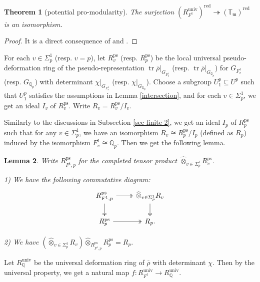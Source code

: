 \documentclass[a4paper, 12pt]{amsart}
\newtheorem{thm}{Theorem}[subsection]
\newtheorem{lem}[thm]{Lemma}
\def\ps{\mathrm{ps}}
\newcommand{\Q}{\mathbb{Q}}
\newcommand{\T}{\mathbb{T}}
\newcommand{\km}{\mathfrak{m}}
\begin{document}
    \begin{thm}[potential pro-modularity]\label{potential pro-modularity irr}
    	The surjection $ (R_{F^1}^{\operatorname{univ}})^{\operatorname{red}} \twoheadrightarrow (\T_\km)^{\operatorname{red}}$ is an isomorphism.
    \end{thm}
    
    \begin{proof}
    	It is a direct consequence of \cite[Proposition 4.3.3]{Zhang:2024aa} and \cite[Proposition 3.1.5]{Zhang:2024ab}.
    \end{proof}
    
    For each $v \in \Sigma_p^1$ (resp. $v=p$), let $R_v^\ps$ (resp. $R_p^\ps$) be the local universal pseudo-deformation ring of the pseudo-representation $\operatorname{tr} \bar{\rho}|_{G_{F^1_v}}$ (resp. $\operatorname{tr} \bar{\rho}|_{G_{\Q_p}}$)  for $ {G_{F^1_v}}$ (resp. $ {G_{\Q_p}}$) with determinant $\chi|_{G_{F^1_v}}$ (resp. $\chi|_{G_{\Q_p}}$). Choose a subgroup $U^p_1 \subseteq U^p$ such that  $U^p_1$ satisfies the assumptions in Lemma \ref{intersection}, and for each $v \in \Sigma_p^1$, we get an ideal $I_v$ of $R_v^\ps$. Write $R_v = R_v^\ps/I_v $.  
    
    Similarly to the discussions in Subsection \ref{sec finite 2}, we get an ideal $I_p$ of $R_p^\ps$ such that for any $v \in \Sigma_p^1$, we have an isomorphism $R_v \cong R_p^\ps/I_p$ (defined as $R_p$) induced by the isomorphism $F^1_v \cong \Q_p$. Then we get the following lemma.
    
    \begin{lem}\label{com dia irr2} Write $R_{F^1, p}^\ps$ for the completed tensor product $ \widehat{\otimes}_{v \in \Sigma^1_p} R_{v}^\ps$.
    	
    	1) We have the following commutative diagram:
    	\[\begin{tikzcd}
    		R_{F^1, p}^\ps  \arrow[r, two heads] \arrow[d, two heads]& \widehat{\otimes}_{v \in \Sigma^1_p} R_{v} \arrow[d, two heads]\\
    		 R_{p}^\ps \arrow[r, two heads] &  R_{p}.
    	\end{tikzcd}\]
    	
    	2) We have $ (\widehat{\otimes}_{v \in \Sigma^1_p} R_{v})\widehat{\otimes}_{R_{F^1, p}^\ps} R_{p}^\ps = R_{p}. $
    \end{lem}
    
    Let $R_\Q^{\operatorname{univ}}$ be the universal deformation ring of $\bar{\rho}$ with determinant $\chi$. Then by the universal property, we get a natural map $f: R_{F^1}^{\operatorname{univ}} \to R_\Q^{\operatorname{univ}} $.
    
\end{document}
